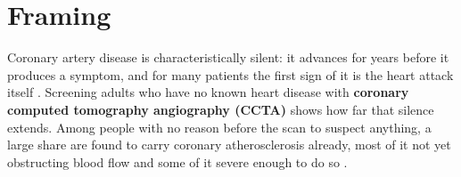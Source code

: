 %
%
%
%
%

\section{Framing}
\label{sec:framing}

Coronary artery disease is characteristically silent: it advances for years before it produces a
symptom, and for many patients the first sign of it is the heart attack itself
\cite{knuuti2019esc}.
Screening adults who have no known heart disease with \textbf{coronary computed tomography
angiography (CCTA)} shows how far that silence extends.
Among people with no reason before the scan to suspect anything, a large share are found to carry
coronary atherosclerosis already, most of it not yet obstructing blood flow and some of it severe
enough to do so \cite{fuchs2023cgps}.

